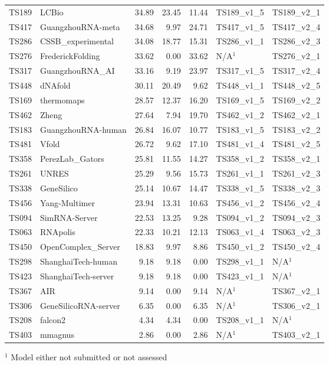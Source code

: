 \begin{table}[ht]
{\begin{tabular}{llrrrll}
TS189 & LCBio & 34.89 & 23.45 & 11.44 & TS189\_v1\_5 & TS189\_v2\_1 \\ 
TS417 & GuangzhouRNA-meta & 34.68 & 9.97 & 24.71 & TS417\_v1\_5 & TS417\_v2\_4 \\ 
TS286 & CSSB\_experimental & 34.08 & 18.77 & 15.31 & TS286\_v1\_1 & TS286\_v2\_3 \\ 
TS276 & FrederickFolding & 33.62 & 0.00 & 33.62 & N/A$^{1}$ & TS276\_v2\_1 \\ 
TS317 & GuangzhouRNA\_AI & 33.16 & 9.19 & 23.97 & TS317\_v1\_5 & TS317\_v2\_4 \\ 
TS448 & dNAfold & 30.11 & 20.49 & 9.62 & TS448\_v1\_1 & TS448\_v2\_5 \\ 
TS169 & thermomaps & 28.57 & 12.37 & 16.20 & TS169\_v1\_5 & TS169\_v2\_2 \\ 
TS462 & Zheng & 27.64 & 7.94 & 19.70 & TS462\_v1\_2 & TS462\_v2\_1 \\ 
TS183 & GuangzhouRNA-human & 26.84 & 16.07 & 10.77 & TS183\_v1\_5 & TS183\_v2\_2 \\ 
TS481 & Vfold & 26.72 & 9.62 & 17.10 & TS481\_v1\_4 & TS481\_v2\_5 \\ 
TS358 & PerezLab\_Gators & 25.81 & 11.55 & 14.27 & TS358\_v1\_2 & TS358\_v2\_1 \\ 
TS261 & UNRES & 25.29 & 9.56 & 15.73 & TS261\_v1\_1 & TS261\_v2\_3 \\ 
TS338 & GeneSilico & 25.14 & 10.67 & 14.47 & TS338\_v1\_5 & TS338\_v2\_3 \\ 
TS456 & Yang-Multimer & 23.94 & 13.31 & 10.63 & TS456\_v1\_2 & TS456\_v2\_4 \\ 
TS094 & SimRNA-Server & 22.53 & 13.25 & 9.28 & TS094\_v1\_2 & TS094\_v2\_3 \\ 
TS063 & RNApolis & 22.33 & 10.21 & 12.13 & TS063\_v1\_4 & TS063\_v2\_3 \\ 
TS450 & OpenComplex\_Server & 18.83 & 9.97 & 8.86 & TS450\_v1\_2 & TS450\_v2\_4 \\ 
TS298 & ShanghaiTech-human & 9.18 & 9.18 & 0.00 & TS298\_v1\_1 & N/A$^{1}$ \\ 
TS423 & ShanghaiTech-server & 9.18 & 9.18 & 0.00 & TS423\_v1\_1 & N/A$^{1}$ \\ 
TS367 & AIR & 9.14 & 0.00 & 9.14 & N/A$^{1}$ & TS367\_v2\_1 \\ 
TS306 & GeneSilicoRNA-server & 6.35 & 0.00 & 6.35 & N/A$^{1}$ & TS306\_v2\_1 \\ 
TS208 & falcon2 & 4.34 & 4.34 & 0.00 & TS208\_v1\_1 & N/A$^{1}$ \\ 
TS403 & mmagnus & 2.86 & 0.00 & 2.86 & N/A$^{1}$ & TS403\_v2\_1 \\ 
\bottomrule
\end{tabular}%
}
\begin{flushleft}\footnotesize $^{1}$ Model either not submitted or not assessed\end{flushleft}
\end{table}
